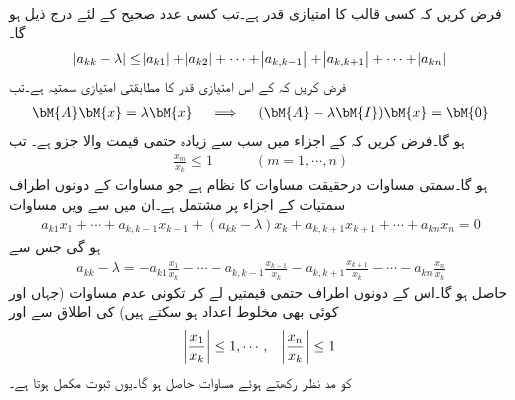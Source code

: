 \quad {}\\
فرض کریں کہ کسی  قالب  کا امتیازی قدر  ہے۔تب کسی عدد صحیح  کے لئے درج ذیل ہو گا۔
\begin{align}\label{مساوات_خطی_اعدادی_گرشگرین_پ}
\abs{a_{kk}-\lambda}\le \abs{a_{k1}}+\abs{a_{k2}}+\cdots+\abs{a_{k,k-1}}+\abs{a_{k,k+1}}+\cdots+\abs{a_{kn}}
\end{align}
\quad
فرض کریں کہ  کے اس امتیازی قدر  کا مطابقتی امتیازی سمتیہ  ہے۔تب
\begin{align}\label{مساوات_خطی_اعدادی_گرشگرین_ٹ}
\bM{A}\bM{x}=\lambda\bM{x}\quad \implies \quad (\bM{A}-\lambda \bM{I})\bM{x}=\bM{0}
\end{align}
ہو گا۔فرض کریں کہ  کے اجزاء میں سب سے زیادہ حتمی قیمت والا جزو  ہے۔ تب
\begin{align*}
\tfrac{x_m}{x_k}\le 1\quad \quad \quad  (m=1,\cdots, n)
\end{align*}
ہو گا۔سمتی مساوات  درحقیقت  مساوات کا نظام ہے جو مساوات کے دونوں اطراف سمتیات کے  اجزاء پر مشتمل ہے۔ان میں سے  ویں مساوات
\begin{align*}
a_{k1}x_1+\cdots+a_{k,k-1}x_{k-1}+(a_{kk}-\lambda)x_k+a_{k,k+1}x_{k+1}+\cdots+a_{kn}x_n=0
\end{align*}
ہو گی جس سے 
\begin{align*}
a_{kk}-\lambda=-a_{k1}\frac{x_1}{x_k}-\cdots-a_{k,k-1}\frac{x_{k-1}}{x_k}-a_{k,k+1}\frac{x_{k+1}}{x_k}-\cdots-a_{kn}\frac{x_{n}}{x_k}
\end{align*}
حاصل ہو گا۔اس کے دونوں اطراف حتمی قیمتیں لے کر تکونی عدم مساوات  (جہاں  اور  کوئی بھی مخلوط اعداد ہو سکتے ہیں) کی اطلاق سے اور
\begin{align*}
\abs{\frac{x_1}{x_k}}\le 1,\cdots, \quad \abs{\frac{x_n}{x_k}}\le 1
\end{align*}
 کو مد نظر رکھتے ہوئے  مساوات  حاصل ہو گا۔یوں ثبوت مکمل ہوتا ہے۔

